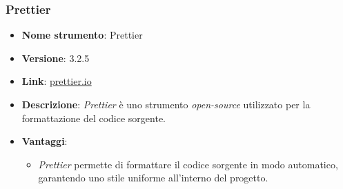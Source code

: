 \subsubsection{Prettier}
\begin{itemize}
    \item \textbf{Nome strumento}: Prettier
    \item \textbf{Versione}: 3.2.5
    \item \textbf{Link}: \href{https://prettier.io/}{prettier.io}
    \item \textbf{Descrizione}: \textit{Prettier} è uno strumento \textit{open-source} utilizzato per la formattazione del codice sorgente.
    \item \textbf{Vantaggi}:
          \begin{itemize}
              \item \textit{Prettier} permette di formattare il codice sorgente in modo automatico, garantendo uno stile uniforme all'interno del progetto.
          \end{itemize}
\end{itemize}

